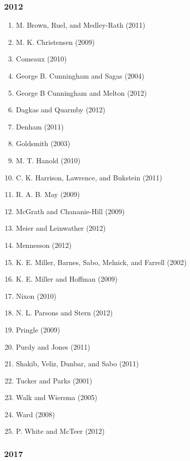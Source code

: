 \documentclass[english,man]{apa6}
\providecommand{\tightlist}{%
  \setlength{\itemsep}{0pt}\setlength{\parskip}{0pt}}
\theoremstyle{definition}
\theoremstyle{definition}
\theoremstyle{definition}
\theoremstyle{remark}
\begin{document}
\subsubsection{2012}\label{section-52}

\begin{enumerate}
\def\labelenumi{\arabic{enumi})}
\tightlist
\item
  M. Brown, Ruel, and Medley-Rath (2011)
\item
  M. K. Christensen (2009)
\item
  Comeaux (2010)
\item
  George B. Cunningham and Sagas (2004)
\item
  George B Cunningham and Melton (2012)
\item
  Dagkas and Quarmby (2012)
\item
  Denham (2011)
\item
  Goldsmith (2003)
\item
  M. T. Hanold (2010)
\item
  C. K. Harrison, Lawrence, and Bukstein (2011)
\item
  R. A. B. May (2009)
\item
  McGrath and Chananie-Hill (2009)
\item
  Meier and Leinwather (2012)
\item
  Mennesson (2012)
\item
  K. E. Miller, Barnes, Sabo, Melnick, and Farrell (2002)
\item
  K. E. Miller and Hoffman (2009)
\item
  Nixon (2010)
\item
  N. L. Parsons and Stern (2012)
\item
  Pringle (2009)
\item
  Purdy and Jones (2011)
\item
  Shakib, Veliz, Dunbar, and Sabo (2011)
\item
  Tucker and Parks (2001)
\item
  Walk and Wiersma (2005)
\item
  Ward (2008)
\item
  P. White and McTeer (2012)
\end{enumerate}

\subsubsection{2017}\label{section-53}
\end{document}
